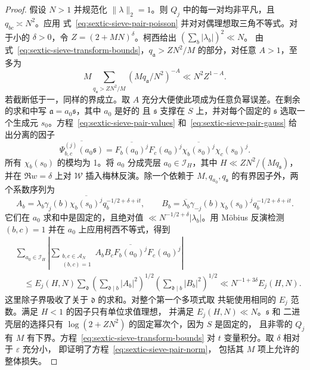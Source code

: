 \documentclass[11pt,a4paper]{article}
\numberwithin{equation}{section}
\numberwithin{figure}{section}
\theoremstyle{definition}
\theoremstyle{remark}
\begin{document}
\begin{proof}
假设 $N>1$ 并规范化 $\|\lambda\|_2=1$。则 $Q_j$ 中的每一对均非平凡，且 $q_{bc}\asymp N^2$。应用
式~\eqref{eq:sextic-sieve-pair-poisson} 并对对偶理想取三角不等式。对于小的 $\delta>0$，令
$Z=(2+MN)^\delta$。柯西给出 $(\sum_b|\lambda_b|)^2\ll N$。
由式~\eqref{eq:sextic-sieve-transform-bounds}，$q_{\mathfrak a}>ZN^2/M$ 的部分，对任意 $A>1$，至多为
\[
 M\sum_{q_{\mathfrak a}>ZN^2/M}(Mq_{\mathfrak a}/N^2)^{-A}
 \ll N^2Z^{1-A}.
\]
若截断低于一，同样的界成立。取 $A$ 充分大便使此项成为任意负幂误差。在剩余的求和中写 $\mathfrak a=a_0\mathfrak s$，其中 $a_0$ 是好的
且 $\mathfrak s$ 支撑在 $S$ 上，并对每个固定的 $\mathfrak s$ 选取一个生成元 $s_0$。方程~\eqref{eq:sextic-sieve-pair-values}
和~\eqref{eq:sextic-sieve-pair-gauss} 给出分离的因子
\[
 \overline{\Psi_{b,c}^{(j)}(a_0\mathfrak s)}
 =\overline{F_b(a_0)^j}F_c(a_0)^j
       \overline{\chi_b(s_0)^j}\chi_c(s_0)^j.
\]
所有 $\chi_b(s_0)$ 的模均为 1。将 $a_0$ 分成壳层
$a_0\in\mathcal I_H$，其中 $H\ll ZN^2/(Mq_{\mathfrak s})$，并在
$\Re w=\delta$ 上对 $\mathscr W$ 插入梅林反演。除一个依赖于
$M,q_{a_0},q_{\mathfrak s}$ 的有界因子外，两个系数序列为
\[
 A_b=\lambda_b\gamma_j(b)\overline{\chi_b(s_0)^j}
                    q_b^{-1/2+\delta+it},\qquad
 B_b=\overline{\lambda_b}\gamma_{-j}(b)\chi_b(s_0)^j
                    q_b^{-1/2+\delta+it}.
\]
它们在 $a_0$ 求和中是固定的，且绝对值
$\ll N^{-1/2+\delta}|\lambda_b|$。用 M\"obius 反演检测 $(b,c)=1$
并在 $a_0$ 上应用柯西不等式，得到
\begin{align*}
 &\sum_{a_0\in\mathcal I_H}
  \left|\sum_{\substack{b,c\in\mathcal A_N\\(b,c)=1}}
       A_bB_c\overline{F_b(a_0)^j}F_c(a_0)^j\right|\\
 &\quad\le E_j(H,N)\sum_{\mathfrak d}
   \left(\sum_{\mathfrak d\mid b}|A_b|^2\right)^{1/2}
   \left(\sum_{\mathfrak d\mid b}|B_b|^2\right)^{1/2}
 \ll N^{-1+3\delta}E_j(H,N).
\end{align*}
这里除子界吸收了关于 $\mathfrak d$ 的求和。对整个第一个多项式取
共轭使用相同的 $E_j$ 范数。满足 $H<1$ 的因子只有单位求值理想，
并满足 $E_j(H,N)\ll N$。$\mathfrak s$ 和
二进壳层的选择只有 $\log(2+ZN^2)$ 的固定幂次个，因为 $S$ 是固定的，
且非零的 $Q_j$ 有 $M$ 有下界。方程~\eqref{eq:sextic-sieve-transform-bounds}
对 $t$ 变量积分。取 $\delta$ 相对于 $\varepsilon$ 充分小，
即证明了方程~\eqref{eq:sextic-sieve-pair-norm}，
包括其 $M$ 项上允许的整体损失。


\end{proof}
\end{document}
